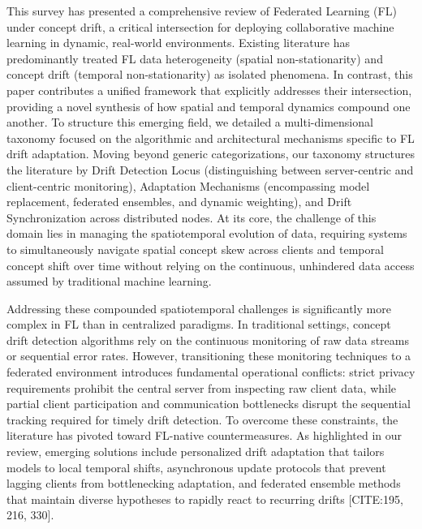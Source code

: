 \documentclass[journal]{IEEEtran}
\begin{document}
This survey has presented a comprehensive review of Federated Learning (FL) under concept drift, a critical intersection for deploying collaborative machine learning in dynamic, real-world environments. Existing literature has predominantly treated FL data heterogeneity (spatial non-stationarity) and concept drift (temporal non-stationarity) as isolated phenomena. In contrast, this paper contributes a unified framework that explicitly addresses their intersection, providing a novel synthesis of how spatial and temporal dynamics compound one another. To structure this emerging field, we detailed a multi-dimensional taxonomy focused on the algorithmic and architectural mechanisms specific to FL drift adaptation. Moving beyond generic categorizations, our taxonomy structures the literature by Drift Detection Locus (distinguishing between server-centric and client-centric monitoring), Adaptation Mechanisms (encompassing model replacement, federated ensembles, and dynamic weighting), and Drift Synchronization across distributed nodes. At its core, the challenge of this domain lies in managing the spatiotemporal evolution of data, requiring systems to simultaneously navigate spatial concept skew across clients and temporal concept shift over time without relying on the continuous, unhindered data access assumed by traditional machine learning.

Addressing these compounded spatiotemporal challenges is significantly more complex in FL than in centralized paradigms. In traditional settings, concept drift detection algorithms rely on the continuous monitoring of raw data streams or sequential error rates. However, transitioning these monitoring techniques to a federated environment introduces fundamental operational conflicts: strict privacy requirements prohibit the central server from inspecting raw client data, while partial client participation and communication bottlenecks disrupt the sequential tracking required for timely drift detection. To overcome these constraints, the literature has pivoted toward FL-native countermeasures. As highlighted in our review, emerging solutions include personalized drift adaptation that tailors models to local temporal shifts, asynchronous update protocols that prevent lagging clients from bottlenecking adaptation, and federated ensemble methods that maintain diverse hypotheses to rapidly react to recurring drifts [CITE:195, 216, 330].
\end{document}
